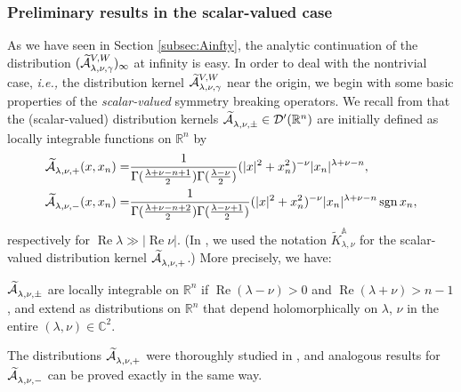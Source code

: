 \subsubsection{Preliminary results in the scalar-valued case}
\label{subsec:shiftA}

As we have seen 
 in Section \ref{subsec:Ainfty}, 
 the analytic continuation 
 of the distribution $(\widetilde{{\mathcal{A}}}_{{\lambda},{\nu},{\gamma}}^{{V,W}})_{\infty}$
 at infinity is easy.  
In order to deal with the nontrivial case,
 {\it{i.e.,}}
 the distribution kernel $\widetilde{{\mathcal{A}}}_{{\lambda},{\nu},{\gamma}}^{{V,W}}$
 near the origin, 
 we begin with some basic properties
 of the {\it{scalar-valued}} symmetry breaking operators.  
We recall from \cite[(7.8)]{sbon} 
 that the (scalar-valued) distribution kernels
 $\widetilde{{\mathcal{A}}}_{{\lambda},{\nu},{\pm}}^{{}} \in {\mathcal{D}}'({\mathbb{R}}^n)$
 are initially defined
 as locally integrable functions on ${\mathbb{R}}^n$
 by 
\begin{align}
\widetilde{{\mathcal{A}}}_{{\lambda},{\nu},{+}}^{{}} (x, x_n)
=& \frac{1}{\Gamma (\frac{\lambda+\nu-n+1}{2}) \Gamma (\frac{\lambda-\nu}{2})}
    (|x|^2+ x_n^2)^{-\nu} |x_n|^{\lambda + \nu -n},
\label{eqn:KAlnn+}
\\
\widetilde{{\mathcal{A}}}_{{\lambda},{\nu},{-}}^{{}} (x, x_n)
=& \frac{1}
   {\Gamma (\frac{\lambda+\nu-n+2}{2}) \Gamma (\frac{\lambda-\nu+1}{2})}
   (|x|^2+ x_n^2)^{-\nu} |x_n|^{\lambda+\nu-n}\operatorname{sgn} x_n,
\label{eqn:KAlnn-}
\end{align}
respectively
 for $\operatorname{Re}\lambda \gg |\operatorname{Re} \nu|$.  
(In \cite{sbon}, 
we used the notation $\widetilde K_{\lambda,\nu}^{\mathbb{A}}$
 for the scalar-valued distribution kernel $\widetilde{{\mathcal{A}}}_{{\lambda},{\nu},{+}}^{{}}$.)
More precisely,
 we have:
\begin{fact}
\label{fact:sbonA}
$\widetilde{{\mathcal{A}}}_{{\lambda},{\nu},{\pm}}^{{}}$ are locally integrable 
 on ${\mathbb{R}}^n$
 if $\operatorname{Re}\left(\lambda - \nu\right)>0$
 and $\operatorname{Re}\left(\lambda + \nu\right)>n-1$, 
 and extend as distributions
 on ${\mathbb{R}}^n$
 that depend holomorphically on $\lambda$, $\nu$
 in the entire $(\lambda,\nu) \in {\mathbb{C}}^2$.  
\end{fact}
The distributions $\widetilde{{\mathcal{A}}}_{{\lambda},{\nu},{+}}^{{}}$ were
 thoroughly studied in \cite[Chap. 7]{sbon}, 
 and analogous results for $\widetilde{{\mathcal{A}}}_{{\lambda},{\nu},{-}}^{{}}$
 can be proved exactly in the same way. 



